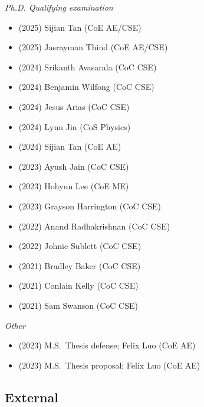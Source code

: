 \textit{Ph.D. Qualifying examination}
\vspace{-0.25cm}
\begin{multicols}{2}
\begin{itemize}
    \item (2025)  Sijian Tan (CoE AE/CSE)
    \item (2025)  Jasrayman Thind (CoE AE/CSE)
    \item (2024)  Srikanth Avasarala (CoC CSE)
    \item (2024)  Benjamin Wilfong (CoC CSE)
    \item (2024)  Jesus Arias (CoC CSE)
    \item (2024)  Lynn Jin (CoS Physics)
    \item (2024)  Sijian Tan (CoE AE)
    \item (2023)  Ayush Jain (CoC CSE)
    \item (2023)  Hohyun Lee (CoE ME)
    \item (2023)  Grayson Harrington (CoC CSE)
    \item (2022)  Anand Radhakrishnan (CoC CSE)
    \item (2022)  Johnie Sublett (CoC CSE)
    \item (2021)  Bradley Baker (CoC CSE)
    \item (2021)  Conlain Kelly (CoC CSE)
    \item (2021)  Sam Swanson (CoC CSE)
\end{itemize}
\end{multicols}

\textit{Other}
\vspace{-0.1cm}
\begin{itemize}
    \item (2023) M.S.\  Thesis defense;  Felix Luo (CoE AE)
    \item (2023) M.S.\  Thesis proposal; Felix Luo (CoE AE)
\end{itemize}

\subsection{External}

